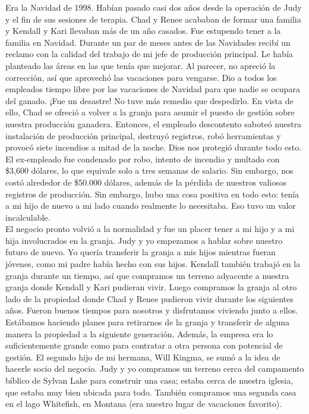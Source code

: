 \documentclass[twoside, 12pt]{book}
\begin{document}
Era la Navidad de 1998. Habían pasado casi dos años desde la operación de Judy y el fin de sus sesiones de terapia. Chad y Renee acababan de formar una familia y Kendall y Kari llevaban más de un año casados. Fue estupendo tener a la familia en Navidad. Durante un par de meses antes de las Navidades recibí un reclamo con la calidad del trabajo de mi jefe de producción principal. Le había planteado las áreas en las que tenía que mejorar. Al parecer, no apreció la corrección, así que aprovechó las vacaciones para vengarse. Dio a todos los empleados tiempo libre por las vacaciones de Navidad para que nadie se ocupara del ganado. ¡Fue un desastre! No tuve más remedio que despedirlo. En vista de ello, Chad se ofreció a volver a la granja para asumir el puesto de gestión sobre nuestra producción ganadera. Entonces, el empleado descontento saboteó nuestra instalación de producción principal, destruyó registros, robó herramientas y provocó siete incendios a mitad de la noche. Dios nos protegió durante todo esto. El ex-empleado fue condenado por robo, intento de incendio y multado con \$3,600 dólares, lo que equivale solo a tres semanas de salario. Sin embargo, nos costó alrededor de \$50.000 dólares, además de la pérdida de nuestros valiosos registros de producción. Sin embargo, hubo una cosa positiva en todo esto: tenía a mi hijo de nuevo a mi lado cuando realmente lo necesitaba. Eso tuvo un valor incalculable.\\

El negocio pronto volvió a la normalidad y fue un placer tener a mi hijo y a mi hija involucrados en la granja. Judy y yo empezamos a hablar sobre nuestro futuro de nuevo. Yo quería transferir la granja a mis hijos mientras fueran jóvenes, como mi padre había hecho con sus hijos. Kendall también trabajó en la granja durante un tiempo, así que compramos un terreno adyacente a nuestra granja donde Kendall y Kari pudieran vivir. Luego compramos la granja al otro lado de la propiedad donde Chad y Renee pudieron vivir durante los siguientes años. Fueron buenos tiempos para nosotros y disfrutamos viviendo junto a ellos. Estábamos haciendo planes para retirarnos de la granja y transferir de alguna manera la propiedad a la siguiente generación. Además, la empresa era lo suficientemente grande como para contratar a otra persona con potencial de gestión. El segundo hijo de mi hermana, Will Kingma, se sumó a la idea de hacerle socio del negocio. Judy y yo compramos un terreno cerca del campamento bíblico de Sylvan Lake para construir una casa; estaba cerca de nuestra iglesia, que estaba muy bien ubicada para todo. También compramos una segunda casa en el lago Whitefish, en Montana (era nuestro lugar de vacaciones favorito).\\
\end{document}
